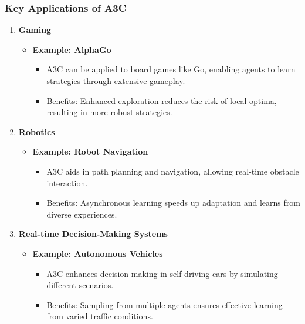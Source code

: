 \documentclass{beamer}
\begin{document}
\begin{frame}[fragile]
    \frametitle{Key Applications of A3C}
    \begin{enumerate}
        \item \textbf{Gaming}
            \begin{itemize}
                \item \textbf{Example: AlphaGo}
                \begin{itemize}
                    \item A3C can be applied to board games like Go, enabling agents to learn strategies through extensive gameplay.
                    \item Benefits: Enhanced exploration reduces the risk of local optima, resulting in more robust strategies.
                \end{itemize}
            \end{itemize}
        
        \item \textbf{Robotics}
            \begin{itemize}
                \item \textbf{Example: Robot Navigation}
                \begin{itemize}
                    \item A3C aids in path planning and navigation, allowing real-time obstacle interaction.
                    \item Benefits: Asynchronous learning speeds up adaptation and learns from diverse experiences.
                \end{itemize}
            \end{itemize}
        
        \item \textbf{Real-time Decision-Making Systems}
            \begin{itemize}
                \item \textbf{Example: Autonomous Vehicles}
                \begin{itemize}
                    \item A3C enhances decision-making in self-driving cars by simulating different scenarios.
                    \item Benefits: Sampling from multiple agents ensures effective learning from varied traffic conditions.
                \end{itemize}
            \end{itemize}
    \end{enumerate}
\end{frame}
\end{document}
